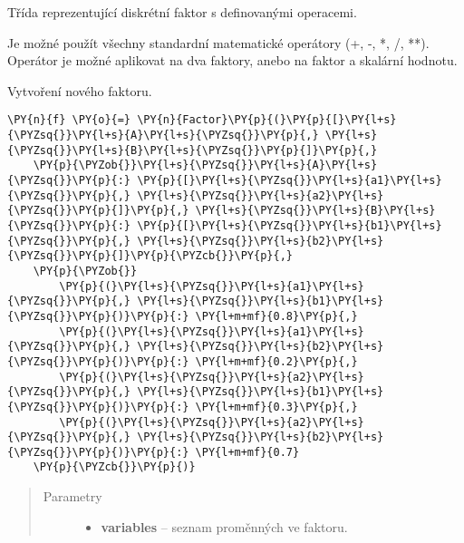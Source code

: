 \begin{fulllineitems}
\label{alex.infer:alex.infer.factor.Factor}
Třída reprezentující diskrétní faktor s definovanými operacemi.

Je možné použít všechny standardní matematické operátory (+, -, *, /,
**). Operátor je možné aplikovat na dva faktory, anebo na faktor a
skalární hodnotu.

\begin{fulllineitems}
\label{alex.infer:alex.infer.factor.Factor.__init__}
Vytvoření nového faktoru.

\begin{Verbatim}[commandchars=\\\{\}]
\PY{n}{f} \PY{o}{=} \PY{n}{Factor}\PY{p}{(}\PY{p}{[}\PY{l+s}{\PYZsq{}}\PY{l+s}{A}\PY{l+s}{\PYZsq{}}\PY{p}{,} \PY{l+s}{\PYZsq{}}\PY{l+s}{B}\PY{l+s}{\PYZsq{}}\PY{p}{]}\PY{p}{,}
    \PY{p}{\PYZob{}}\PY{l+s}{\PYZsq{}}\PY{l+s}{A}\PY{l+s}{\PYZsq{}}\PY{p}{:} \PY{p}{[}\PY{l+s}{\PYZsq{}}\PY{l+s}{a1}\PY{l+s}{\PYZsq{}}\PY{p}{,} \PY{l+s}{\PYZsq{}}\PY{l+s}{a2}\PY{l+s}{\PYZsq{}}\PY{p}{]}\PY{p}{,} \PY{l+s}{\PYZsq{}}\PY{l+s}{B}\PY{l+s}{\PYZsq{}}\PY{p}{:} \PY{p}{[}\PY{l+s}{\PYZsq{}}\PY{l+s}{b1}\PY{l+s}{\PYZsq{}}\PY{p}{,} \PY{l+s}{\PYZsq{}}\PY{l+s}{b2}\PY{l+s}{\PYZsq{}}\PY{p}{]}\PY{p}{\PYZcb{}}\PY{p}{,}
    \PY{p}{\PYZob{}}
        \PY{p}{(}\PY{l+s}{\PYZsq{}}\PY{l+s}{a1}\PY{l+s}{\PYZsq{}}\PY{p}{,} \PY{l+s}{\PYZsq{}}\PY{l+s}{b1}\PY{l+s}{\PYZsq{}}\PY{p}{)}\PY{p}{:} \PY{l+m+mf}{0.8}\PY{p}{,}
        \PY{p}{(}\PY{l+s}{\PYZsq{}}\PY{l+s}{a1}\PY{l+s}{\PYZsq{}}\PY{p}{,} \PY{l+s}{\PYZsq{}}\PY{l+s}{b2}\PY{l+s}{\PYZsq{}}\PY{p}{)}\PY{p}{:} \PY{l+m+mf}{0.2}\PY{p}{,}
        \PY{p}{(}\PY{l+s}{\PYZsq{}}\PY{l+s}{a2}\PY{l+s}{\PYZsq{}}\PY{p}{,} \PY{l+s}{\PYZsq{}}\PY{l+s}{b1}\PY{l+s}{\PYZsq{}}\PY{p}{)}\PY{p}{:} \PY{l+m+mf}{0.3}\PY{p}{,}
        \PY{p}{(}\PY{l+s}{\PYZsq{}}\PY{l+s}{a2}\PY{l+s}{\PYZsq{}}\PY{p}{,} \PY{l+s}{\PYZsq{}}\PY{l+s}{b2}\PY{l+s}{\PYZsq{}}\PY{p}{)}\PY{p}{:} \PY{l+m+mf}{0.7}
    \PY{p}{\PYZcb{}}\PY{p}{)}
\end{Verbatim}
\begin{quote}\begin{description}
\item[{Parametry}] \leavevmode\begin{itemize}
\item {} 
\textbf{variables} -- seznam proměnných ve faktoru.


\end{itemize}
\end{description}
\end{quote}
\end{fulllineitems}
\end{fulllineitems}
